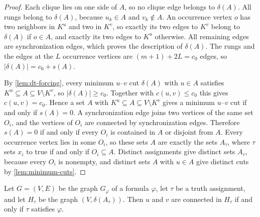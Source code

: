 \begin{proof}
Each clique lies on one side of $A$, so no clique edge belongs to $\delta(A)$.
All rungs belong to $\delta(A)$, because $u_k \in A$ and $v_k \notin A$.
An occurrence vertex $o$ has two neighbors in $K^u$ and two in $K^v$, so exactly its two edges to $K^v$ belong to $\delta(A)$ if $o \in A$, and exactly its two edges to $K^u$ otherwise.
All remaining edges are synchronization edges, which proves the description of $\delta(A)$.
The rungs and the edges at the $L$ occurrence vertices are $(m + 1) + 2L = c_0$ edges, so $|\delta(A)| = c_0 + s(A)$.

By \cref{lem:dt-forcing}, every minimum $u$--$v$ cut $\delta(A)$ with $u \in A$ satisfies $K^u \subseteq A \subseteq V \setminus K^v$, so $|\delta(A)| \geq c_0$.
Together with $c(u, v) \leq c_0$ this gives $c(u, v) = c_0$.
Hence a set $A$ with $K^u \subseteq A \subseteq V \setminus K^v$ gives a minimum $u$--$v$ cut if and only if $s(A) = 0$.
A synchronization edge joins two vertices of the same set $O_i$, and the vertices of $O_i$ are connected by synchronization edges.
Therefore $s(A) = 0$ if and only if every $O_i$ is contained in $A$ or disjoint from $A$.
Every occurrence vertex lies in some $O_i$, so these sets $A$ are exactly the sets $A_\tau$, where $\tau$ sets $x_i$ to true if and only if $O_i \subseteq A$.
Distinct assignments give distinct sets $A_\tau$, because every $O_i$ is nonempty, and distinct sets $A$ with $u \in A$ give distinct cuts by \cref{lem:minimum-cuts}.
\end{proof}

\begin{lemma}
\label{lem:dt-cut-graphs}
Let $G = (V, E)$ be the graph $G_\varphi$ of a formula $\varphi$, let $\tau$ be a truth assignment, and let $H_\tau$ be the graph $(V, \delta(A_\tau))$.
Then $u$ and $v$ are connected in $H_\tau$ if and only if $\tau$ satisfies $\varphi$.
\end{lemma}

